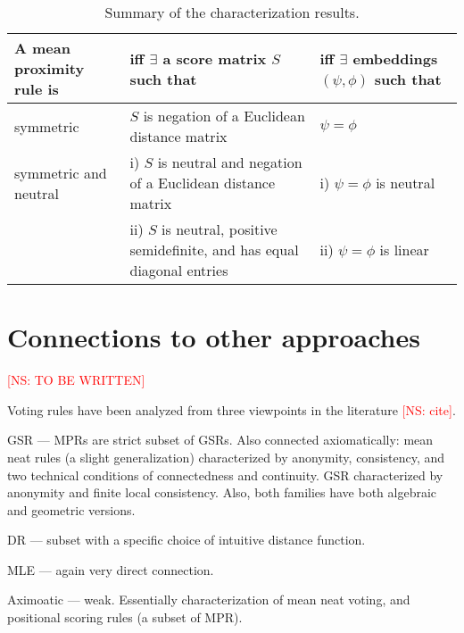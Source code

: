\documentclass[prodmode,acmec]{ec-acmsmall}
\newcommand{\kibitz}[2]{\ifnum\Comments=1\textcolor{#1}{#2}\fi}
\newcommand{\ns}[1]{\kibitz{red} {[NS: #1]}}
\begin{document}
\begin{table}[ht]
\centering
\begin{tabular}{ | p{3.5cm} | p{4cm} | p{3.5cm} | }
\hline
\rule{0pt}{3ex}\textbf{A mean proximity rule is} & \textbf{iff $\boldsymbol{\exists}$ a score matrix $S$ such that} & \textbf{iff $\exists$ embeddings $(\psi,\phi)$ such that} \\[0.1cm] 
\hline 
\rule{0pt}{3ex}symmetric & $S$ is negation of a Euclidean distance matrix & $\psi = \phi$ \\[0.1cm]
\hline
\rule{0pt}{3ex}\multirow{2}{*} {symmetric and neutral} & i) $S$ is neutral and negation of a Euclidean distance matrix & i) $\psi = \phi$ is neutral\\
& ii) $S$ is neutral, positive semidefinite, and has equal diagonal entries & ii) $\psi = \phi$ is linear \\[0.1cm]
\hline
\end{tabular}
\captionsetup{width=\textwidth}
\caption{Summary of the characterization results.}
\label{tab:summary}
\end{table}


\section{Connections to other approaches}
\ns{TO BE WRITTEN}

Voting rules have been analyzed from three viewpoints in the literature \ns{cite}.

GSR --- MPRs are strict subset of GSRs. Also connected axiomatically: mean neat rules (a slight generalization) characterized by anonymity, consistency, and two technical conditions of connectedness and continuity. GSR characterized by anonymity and finite local consistency. Also, both families have both algebraic and geometric versions. 

DR --- subset with a specific choice of intuitive distance function. 

MLE --- again very direct connection.

Aximoatic --- weak. Essentially characterization of mean neat voting, and positional scoring rules (a subset of MPR).

\end{document}
